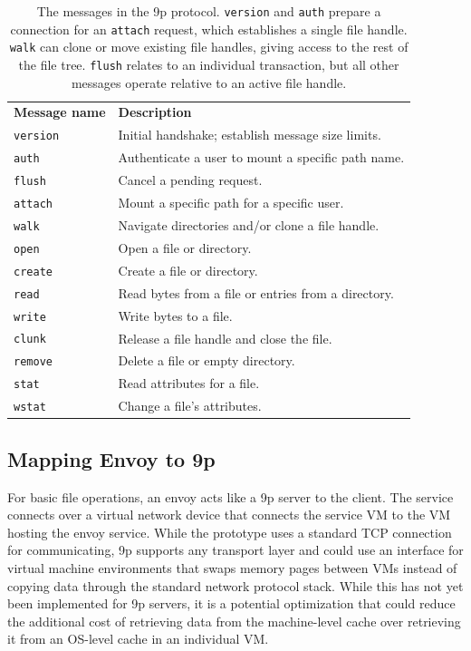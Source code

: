 \begin{table}[tp]
\begin{center}
\begin{tabular}{lp{8cm}}
\textbf{Message name} & \textbf{Description} \\
\texttt{version} & Initial handshake; establish message size limits. \\
\texttt{auth} & Authenticate a user to mount a specific path name. \\
\texttt{flush} & Cancel a pending request. \\
\texttt{attach} & Mount a specific path for a specific user. \\
\texttt{walk} & Navigate directories and/or clone a file handle. \\
\texttt{open} & Open a file or directory. \\
\texttt{create} & Create a file or directory. \\
\texttt{read} & Read bytes from a file or entries from a directory. \\
\texttt{write} & Write bytes to a file. \\
\texttt{clunk} & Release a file handle and close the file. \\
\texttt{remove} & Delete a file or empty directory. \\
\texttt{stat} & Read attributes for a file. \\
\texttt{wstat} & Change a file's attributes.
\end{tabular}
\end{center}
\caption[Messages in the 9p protocol]{The messages in the 9p protocol. \texttt{version} and \texttt{auth} prepare a connection for an \texttt{attach} request, which establishes a single file handle. \texttt{walk} can clone or move existing file handles, giving access to the rest of the file tree. \texttt{flush} relates to an individual transaction, but all other messages operate relative to an active file handle.}
\label{tab:9p-messages}
\end{table}

\subsection{Mapping Envoy to 9p}

For basic file operations, an envoy acts like a 9p server to the client. The service connects over a virtual network device that connects the service VM to the VM hosting the envoy service. While the prototype uses a standard TCP connection for communicating, 9p supports any transport layer and could use an interface for virtual machine environments that swaps memory pages between VMs instead of copying data through the standard network protocol stack. While this has not yet been implemented for 9p servers, it is a potential optimization that could reduce the additional cost of retrieving data from the machine-level cache over retrieving it from an OS-level cache in an individual VM.

